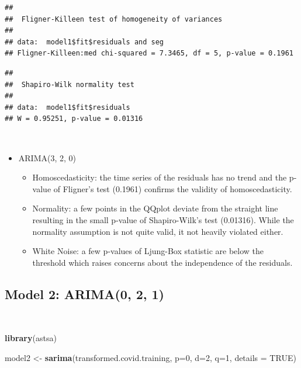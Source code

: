 \documentclass[]{article}
\newenvironment{Shaded}{\begin{snugshade}}{\end{snugshade}}
\newcommand{\DataTypeTok}[1]{\textcolor[rgb]{0.13,0.29,0.53}{#1}}
\newcommand{\DecValTok}[1]{\textcolor[rgb]{0.00,0.00,0.81}{#1}}
\newcommand{\KeywordTok}[1]{\textcolor[rgb]{0.13,0.29,0.53}{\textbf{#1}}}
\newcommand{\NormalTok}[1]{#1}
\newcommand{\OperatorTok}[1]{\textcolor[rgb]{0.81,0.36,0.00}{\textbf{#1}}}
\newcommand{\OtherTok}[1]{\textcolor[rgb]{0.56,0.35,0.01}{#1}}
\newcommand{\StringTok}[1]{\textcolor[rgb]{0.31,0.60,0.02}{#1}}
\providecommand{\tightlist}{%
  \setlength{\itemsep}{0pt}\setlength{\parskip}{0pt}}
\begin{document}
\begin{verbatim}
## 
##  Fligner-Killeen test of homogeneity of variances
## 
## data:  model1$fit$residuals and seg
## Fligner-Killeen:med chi-squared = 7.3465, df = 5, p-value = 0.1961
\end{verbatim}

\begin{Shaded}
\end{Shaded}

\begin{verbatim}
## 
##  Shapiro-Wilk normality test
## 
## data:  model1$fit$residuals
## W = 0.95251, p-value = 0.01316
\end{verbatim}

\(\;\)

\begin{itemize}
\tightlist
\item
  ARIMA(3, 2, 0)

  \begin{itemize}
  \tightlist
  \item
    Homoscedasticity: the time series of the residuals has no trend and
    the p-value of Fligner's test (0.1961) confirms the validity of
    homoscedasticity.
  \item
    Normality: a few points in the QQplot deviate from the straight line
    resulting in the small p-value of Shapiro-Wilk's test (0.01316).
    While the normality assumption is not quite valid, it not heavily
    violated either.
  \item
    White Noise: a few p-values of Ljung-Box statistic are below the
    threshold which raises concerns about the independence of the
    residuals.
  \end{itemize}
\end{itemize}

\newpage

\hypertarget{model-2-arima0-2-1}{%
\subsection{Model 2: ARIMA(0, 2, 1)}\label{model-2-arima0-2-1}}

\(\;\)

\begin{Shaded}
\begin{Highlighting}[]
\KeywordTok{library}\NormalTok{(astsa)}

\NormalTok{model2 <-}\StringTok{ }\KeywordTok{sarima}\NormalTok{(transformed.covid.training, }\DataTypeTok{p=}\DecValTok{0}\NormalTok{, }\DataTypeTok{d=}\DecValTok{2}\NormalTok{, }\DataTypeTok{q=}\DecValTok{1}\NormalTok{, }\DataTypeTok{details =} \OtherTok{TRUE}\NormalTok{)}
\end{Highlighting}
\end{Shaded}
\end{document}
